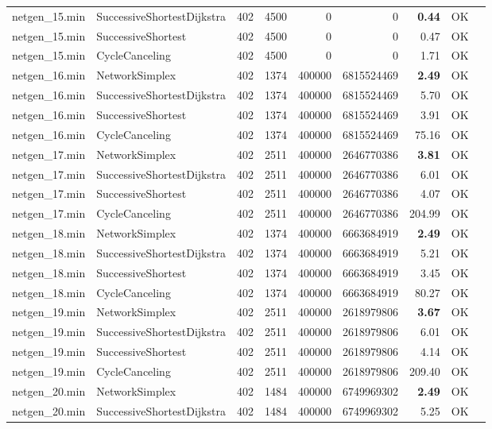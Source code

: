 \begin{longtable}{llrrrrrrl}
netgen\_15.min & SuccessiveShortestDijkstra & 402 & 4500 & 0 & 0 & \textbf{0.44} & OK \\
netgen\_15.min & SuccessiveShortest & 402 & 4500 & 0 & 0 & 0.47 & OK \\
netgen\_15.min & CycleCanceling & 402 & 4500 & 0 & 0 & 1.71 & OK \\
\midrule
netgen\_16.min & NetworkSimplex & 402 & 1374 & 400000 & 6815524469 & \textbf{2.49} & OK \\
netgen\_16.min & SuccessiveShortestDijkstra & 402 & 1374 & 400000 & 6815524469 & 5.70 & OK \\
netgen\_16.min & SuccessiveShortest & 402 & 1374 & 400000 & 6815524469 & 3.91 & OK \\
netgen\_16.min & CycleCanceling & 402 & 1374 & 400000 & 6815524469 & 75.16 & OK \\
\midrule
netgen\_17.min & NetworkSimplex & 402 & 2511 & 400000 & 2646770386 & \textbf{3.81} & OK \\
netgen\_17.min & SuccessiveShortestDijkstra & 402 & 2511 & 400000 & 2646770386 & 6.01 & OK \\
netgen\_17.min & SuccessiveShortest & 402 & 2511 & 400000 & 2646770386 & 4.07 & OK \\
netgen\_17.min & CycleCanceling & 402 & 2511 & 400000 & 2646770386 & 204.99 & OK \\
\midrule
netgen\_18.min & NetworkSimplex & 402 & 1374 & 400000 & 6663684919 & \textbf{2.49} & OK \\
netgen\_18.min & SuccessiveShortestDijkstra & 402 & 1374 & 400000 & 6663684919 & 5.21 & OK \\
netgen\_18.min & SuccessiveShortest & 402 & 1374 & 400000 & 6663684919 & 3.45 & OK \\
netgen\_18.min & CycleCanceling & 402 & 1374 & 400000 & 6663684919 & 80.27 & OK \\
\midrule
netgen\_19.min & NetworkSimplex & 402 & 2511 & 400000 & 2618979806 & \textbf{3.67} & OK \\
netgen\_19.min & SuccessiveShortestDijkstra & 402 & 2511 & 400000 & 2618979806 & 6.01 & OK \\
netgen\_19.min & SuccessiveShortest & 402 & 2511 & 400000 & 2618979806 & 4.14 & OK \\
netgen\_19.min & CycleCanceling & 402 & 2511 & 400000 & 2618979806 & 209.40 & OK \\
\midrule
netgen\_20.min & NetworkSimplex & 402 & 1484 & 400000 & 6749969302 & \textbf{2.49} & OK \\
netgen\_20.min & SuccessiveShortestDijkstra & 402 & 1484 & 400000 & 6749969302 & 5.25 & OK \\

\end{longtable}
